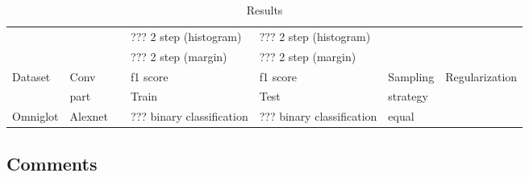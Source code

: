 \documentclass[10pt,a4paper]{article}
\begin{document}
\begin{table}[h!]
\begin{tabular}{|l|l|l|l|l|l|l|}
            & & & ??? 2 step (histogram)      & ??? 2 step (histogram)      & &                      \\
            & & & ??? 2 step (margin)         & ??? 2 step (margin)         & &                      \\ \hline \hline
            Dataset & Conv & & f1 score & f1 score & Sampling & Regularization       \\
            & part & & Train & Test & strategy &                      \\ \hline
            Omniglot & Alexnet & & ??? binary classification & ??? binary classification & equal &                      \\
            \hline
        \end{tabular}
        \caption{Results}
        \label{table:main_table}
    \end{table}

    \subsection{Comments}\label{subsec:comments}
\end{document}
